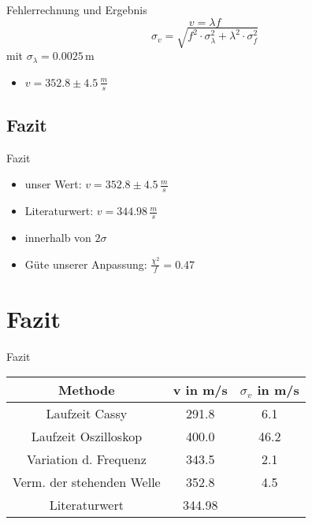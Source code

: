\documentclass[11pt]{beamer}
\begin{document}
\begin{frame}{Fehlerrechnung und Ergebnis}
\begin{equation*}
v=\lambda f
\end{equation*}
\begin{equation*}
\sigma_{v} = \sqrt{f^2\cdot\sigma_{\lambda}^2 + \lambda^2\cdot\sigma_{f}^2}
\end{equation*}
mit $\sigma_{\lambda} = 0.0025\,$m 
\begin{itemize}
\item $v = 352.8 \pm 4.5\,\frac{m}{s}$
\end{itemize}
\end{frame}

\subsection{Fazit}
\begin{frame}{Fazit}
\begin{itemize}
\item unser Wert: $v = 352.8 \pm 4.5\,\frac{m}{s}$ 
\item Literaturwert: $v = 344.98\,\frac{m}{s}$
\item innerhalb von $2 \sigma$
\item Güte unserer Anpassung: $\frac{\chi^2}{f} = 0.47$
\end{itemize}
\end{frame}

\section{Fazit}
\begin{frame}{Fazit}
\begin{tabular}{|c|c|c|}
\hline 
Methode & v in m/s & $\sigma_v$ in m/s \\ 
\hline 
Laufzeit Cassy & 291.8 & 6.1 \\ 
\hline 
Laufzeit Oszilloskop & 400.0 & 46.2 \\ 
\hline 
Variation d. Frequenz & 343.5 & 2.1 \\ 
\hline 
Verm. der stehenden Welle & 352.8 & 4.5 \\ 
\hline 
Literaturwert & 344.98 &  \\ 
\hline 
\end{tabular} 
\end{frame}

\end{document}
